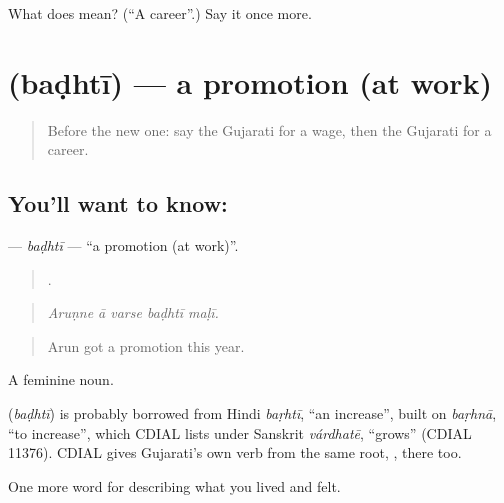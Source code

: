 \begin{tcolorbox}[breakable,colback=teal!4,colframe=teal!35!black,title={Before you move on}]
What does  mean? (\textquotedblleft{}A career\textquotedblright{}.) Say it once more.
\end{tcolorbox}
\section[\texorpdfstring{\gu{બઢતી} (baḍhtī)}{બઢતી (baḍhtī)}]{ (baḍhtī) — a promotion (at work)}

\label{lesson:GU-C512-badhti}



\begin{quote}
Before the new one: say the Gujarati for a wage, then the Gujarati for a career.
\end{quote}

\subsection*{You'll want to know: }
\textbf{} — \emph{baḍhtī} — \textquotedblleft{}a promotion (at work)\textquotedblright{}.

\begin{quote}
    .
\end{quote}

\begin{quote}
\emph{Aruṇne ā varse baḍhtī maḷī.}
\end{quote}

\begin{quote}
Arun got a promotion this year.
\end{quote}

A feminine noun.

\begin{cousinweb}
\textbf{} (\emph{baḍhtī}) is probably borrowed from Hindi \emph{baṛhtī}, \textquotedblleft{}an increase\textquotedblright{}, built on \emph{baṛhnā}, \textquotedblleft{}to increase\textquotedblright{}, which CDIAL lists under Sanskrit \emph{várdhatē}, \textquotedblleft{}grows\textquotedblright{} (CDIAL 11376). CDIAL gives Gujarati's own verb from the same root, \textbf{}, there too.
\end{cousinweb}

\begin{grammarlens}[title={What you've built}]
One more word for describing what you lived and felt.
\end{grammarlens}

